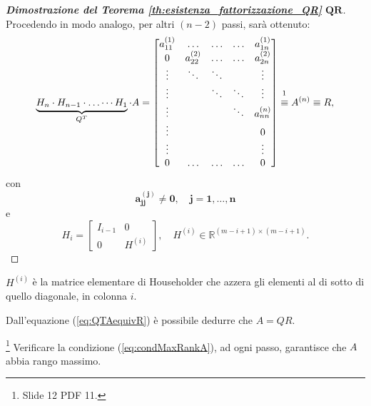\begin{proof}[\textbf{Dimostrazione del Teorema \ref{th:esistenza_fattorizzazione_QR}} $\boldsymbol{QR}$]
    Procedendo in modo analogo, per altri $(n-2)$ passi, sarà ottenuto:
    \begin{equation}\label{eq:QTAequivR}
        \underbrace{H_n\cdot H_{n-1}\cdot\hdots\cdots H_1}_{Q^T}\cdot A =
        \begin{bmatrix}
            a_{11}^{(1)} &\hdots & \hdots & \hdots & a_{1n}^{(1)}\\
            0 & a_{22}^{(2)} & \hdots & \hdots & a_{2n}^{(2)}\\
            \vdots & \ddots & \ddots & & \vdots \\
            \vdots & & \ddots & \ddots & \vdots\\
            \vdots & & & \ddots & a_{nn}^{(n)}\\
            \vdots & & & & 0\\
            \vdots & & & & \vdots\\
            0 & \hdots & \hdots & \hdots & 0
        \end{bmatrix}\overset{\footnotemark}{\equiv} A^{(n)}\equiv R,
    \end{equation}
    \noindent con
    \begin{equation}\label{eq:condMaxRankA}
        \boldsymbol{a_{jj}^{(j)}\neq0,\quad j=1,\hdots, n}
    \end{equation}
    e
    \begin{equation*}
        H_i=
        \left[\begin{array}{c|c}
             I_{i-1}& 0 \\
             \hline
             0 & H^{(i)}
        \end{array}\right],\quad H^{(i)}\in\mathbb R^{(m-i+1)\times(m-i+1)}.
    \end{equation*}
\end{proof}

\begin{remark}
    $H^{(i)}$ è la matrice elementare di Householder che azzera gli elementi al di sotto di quello diagonale, in colonna $i$.
\end{remark}

\begin{remark}
    Dall'equazione (\ref{eq:QTAequivR}) è possibile dedurre che $A=QR$.
\end{remark}

\begin{remark}\footnote{Slide 12 PDF 11.}
    Verificare la condizione (\ref{eq:condMaxRankA}), ad ogni passo, garantisce che $A$ abbia rango massimo.
\end{remark}

